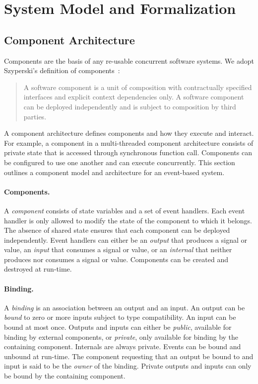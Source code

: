 \section{System Model and Formalization\label{system_model}}

\subsection{Component Architecture}

Components are the basis of any re-usable concurrent software systems.
We adopt Szyperski's definition of components~\cite{component_software}:
\begin{quote}
  A software component is a unit of composition with contractually specified interfaces and explicit context dependencies only.
  A software component can be deployed independently and is subject to composition by third parties. 
\end{quote}
A component architecture defines components and how they execute and interact.
For example, a component in a multi-threaded component architecture consists of private state that is accessed through synchronous function call.
Components can be configured to use one another and can execute concurrently.
This section outlines a component model and architecture for an event-based system.

\paragraph{Components.}
A \emph{component} consists of state variables and a set of event handlers.
Each event handler is only allowed to modify the state of the component to which it belongs.
The absence of shared state ensures that each component can be deployed independently.
Event handlers can either be an \emph{output} that produces a signal or value, an \emph{input} that consumes a signal or value, or an \emph{internal} that neither produces nor consumes a signal or value.
Components can be created and destroyed at run-time.

\paragraph{Binding.}
A \emph{binding} is an association between an output and an input.
An output can be \emph{bound} to zero or more inputs subject to type compatibility.
An input can be bound at most once.
Outputs and inputs can either be \emph{public}, available for binding by external components, or \emph{private}, only available for binding by the containing component.
Internals are always private.
Events can be bound and unbound at run-time.
The component requesting that an output be bound to and input is said to be the \emph{owner} of the binding.
Private outputs and inputs can only be bound by the containing component.

